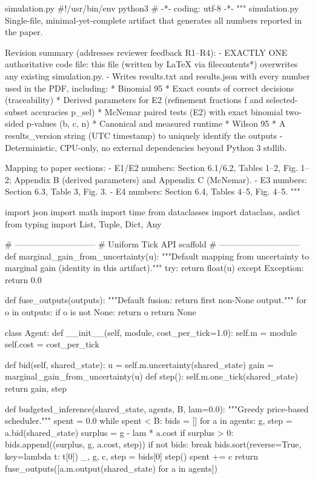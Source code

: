 \begin{filecontents*}{simulation.py}
#!/usr/bin/env python3
# -*- coding: utf-8 -*-
"""
simulation.py
Single-file, minimal-yet-complete artifact that generates all numbers reported in the paper.

Revision summary (addresses reviewer feedback R1–R4):
- EXACTLY ONE authoritative code file: this file (written by LaTeX via filecontents*) overwrites any existing simulation.py.
- Writes results.txt and results.json with every number used in the PDF, including:
  * Binomial 95%
  * Exact counts of correct decisions (traceability)
  * Derived parameters for E2 (refinement fractions f and selected-subset accuracies p_sel)
  * McNemar paired tests (E2) with exact binomial two-sided p-values (b, c, n)
  * Canonical and measured runtime
  * Wilson 95%
  * A results_version string (UTC timestamp) to uniquely identify the outputs
- Deterministic, CPU-only, no external dependencies beyond Python 3 stdlib.

Mapping to paper sections:
- E1/E2 numbers: Section 6.1/6.2, Tables 1–2, Fig. 1–2; Appendix B (derived parameters) and Appendix C (McNemar).
- E3 numbers: Section 6.3, Table 3, Fig. 3.
- E4 numbers: Section 6.4, Tables 4–5, Fig. 4–5.
"""

import json
import math
import time
from dataclasses import dataclass, asdict
from typing import List, Tuple, Dict, Any


# -----------------------------
# Uniform Tick API scaffold
# -----------------------------
def marginal_gain_from_uncertainty(u):
    """Default mapping from uncertainty to marginal gain (identity in this artifact)."""
    try:
        return float(u)
    except Exception:
        return 0.0


def fuse_outputs(outputs):
    """Default fusion: return first non-None output."""
    for o in outputs:
        if o is not None:
            return o
    return None


class Agent:
    def __init__(self, module, cost_per_tick=1.0):
        self.m = module
        self.cost = cost_per_tick

    def bid(self, shared_state):
        u = self.m.uncertainty(shared_state)
        gain = marginal_gain_from_uncertainty(u)
        def step():
            self.m.one_tick(shared_state)
        return gain, step


def budgeted_inference(shared_state, agents, B, lam=0.0):
    """Greedy price-based scheduler."""
    spent = 0.0
    while spent < B:
        bids = []
        for a in agents:
            g, step = a.bid(shared_state)
            surplus = g - lam * a.cost
            if surplus > 0:
                bids.append((surplus, g, a.cost, step))
        if not bids:
            break
        bids.sort(reverse=True, key=lambda t: t[0])
        _, g, c, step = bids[0]
        step()
        spent += c
    return fuse_outputs([a.m.output(shared_state) for a in agents])



\end{filecontents*}
